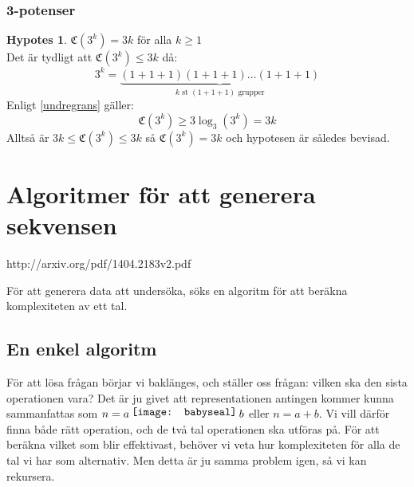 \documentclass[a4paper,titlepage]{article}
\newcommand{\C}[1]{\mathfrak C \left( #1 \right)}
\theoremstyle{definition}
\newtheorem*{hypot}{Hypotes}
\newcommand*\foobar{\texttt{[image: babyseal]}}
\renewcommand\cdot{\mathbin{\raisebox{2pt}{\foobar}}}
\begin{document}
        \subsubsection{3-potenser}
        \begin{hypot}
            $\C{3^k}=3k$ \quad för alla $k\ge1$ \\
            Det är tydligt att $\C{3^k} \le 3k$ då:
            $$ 3^k = \underbrace{(1+1+1)(1+1+1)\ldots(1+1+1)}_{k \text{ st } (1+1+1) \text{ grupper}}$$
            Enligt \cref{undregrans} gäller:
            $$ \C{3^k} \ge 3\log_3(3^k) = 3k $$
            Alltså är $3k\le\C{3^k}\le3k$ så $\C{3^k}=3k$ och hypotesen är
            således bevisad.
        \end{hypot}
            



\section{Algoritmer för att generera sekvensen}

    http://arxiv.org/pdf/1404.2183v2.pdf

    För att generera data att undersöka, söks en algoritm för att beräkna
    komplexiteten av ett tal.

    \subsection{En enkel algoritm}

    För att lösa frågan börjar vi baklänges, och ställer oss frågan: vilken ska den
    sista operationen vara?  Det är ju givet att representationen antingen kommer
    kunna sammanfattas som $n = a\cdot b$ eller $n = a+b$. Vi vill därför finna både rätt operation, och de två tal operationen ska
    utföras på. För att beräkna vilket som blir effektivast, behöver vi veta hur komplexiteten för alla de tal vi har som alternativ.
    Men detta är ju samma problem igen, så vi kan rekursera.
    
\end{document}
